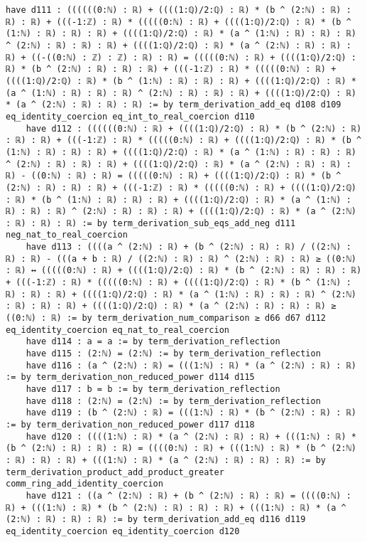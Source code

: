 \documentclass{article}
\begin{document}
\begin{tcolorbox}[colback=white!10, width=\linewidth]
\begin{lstlisting}[language=Lean4]
    have d111 : ((((((0:ℕ) : ℝ) + ((((1:ℚ)/2:ℚ) : ℝ) * (b ^ (2:ℕ) : ℝ) : ℝ) : ℝ) + (((-1:ℤ) : ℝ) * (((((0:ℕ) : ℝ) + ((((1:ℚ)/2:ℚ) : ℝ) * (b ^ (1:ℕ) : ℝ) : ℝ) : ℝ) + ((((1:ℚ)/2:ℚ) : ℝ) * (a ^ (1:ℕ) : ℝ) : ℝ) : ℝ) ^ (2:ℕ) : ℝ) : ℝ) : ℝ) + ((((1:ℚ)/2:ℚ) : ℝ) * (a ^ (2:ℕ) : ℝ) : ℝ) : ℝ) + ((-((0:ℕ) : ℤ) : ℤ) : ℝ) : ℝ) = (((((0:ℕ) : ℝ) + ((((1:ℚ)/2:ℚ) : ℝ) * (b ^ (2:ℕ) : ℝ) : ℝ) : ℝ) + (((-1:ℤ) : ℝ) * (((((0:ℕ) : ℝ) + ((((1:ℚ)/2:ℚ) : ℝ) * (b ^ (1:ℕ) : ℝ) : ℝ) : ℝ) + ((((1:ℚ)/2:ℚ) : ℝ) * (a ^ (1:ℕ) : ℝ) : ℝ) : ℝ) ^ (2:ℕ) : ℝ) : ℝ) : ℝ) + ((((1:ℚ)/2:ℚ) : ℝ) * (a ^ (2:ℕ) : ℝ) : ℝ) : ℝ) := by term_derivation_add_eq d108 d109 eq_identity_coercion eq_int_to_real_coercion d110
    have d112 : ((((((0:ℕ) : ℝ) + ((((1:ℚ)/2:ℚ) : ℝ) * (b ^ (2:ℕ) : ℝ) : ℝ) : ℝ) + (((-1:ℤ) : ℝ) * (((((0:ℕ) : ℝ) + ((((1:ℚ)/2:ℚ) : ℝ) * (b ^ (1:ℕ) : ℝ) : ℝ) : ℝ) + ((((1:ℚ)/2:ℚ) : ℝ) * (a ^ (1:ℕ) : ℝ) : ℝ) : ℝ) ^ (2:ℕ) : ℝ) : ℝ) : ℝ) + ((((1:ℚ)/2:ℚ) : ℝ) * (a ^ (2:ℕ) : ℝ) : ℝ) : ℝ) - ((0:ℕ) : ℝ) : ℝ) = (((((0:ℕ) : ℝ) + ((((1:ℚ)/2:ℚ) : ℝ) * (b ^ (2:ℕ) : ℝ) : ℝ) : ℝ) + (((-1:ℤ) : ℝ) * (((((0:ℕ) : ℝ) + ((((1:ℚ)/2:ℚ) : ℝ) * (b ^ (1:ℕ) : ℝ) : ℝ) : ℝ) + ((((1:ℚ)/2:ℚ) : ℝ) * (a ^ (1:ℕ) : ℝ) : ℝ) : ℝ) ^ (2:ℕ) : ℝ) : ℝ) : ℝ) + ((((1:ℚ)/2:ℚ) : ℝ) * (a ^ (2:ℕ) : ℝ) : ℝ) : ℝ) := by term_derivation_sub_eqs_add_neg d111 neg_nat_to_real_coercion
    have d113 : ((((a ^ (2:ℕ) : ℝ) + (b ^ (2:ℕ) : ℝ) : ℝ) / ((2:ℕ) : ℝ) : ℝ) - (((a + b : ℝ) / ((2:ℕ) : ℝ) : ℝ) ^ (2:ℕ) : ℝ) : ℝ) ≥ ((0:ℕ) : ℝ) ↔ (((((0:ℕ) : ℝ) + ((((1:ℚ)/2:ℚ) : ℝ) * (b ^ (2:ℕ) : ℝ) : ℝ) : ℝ) + (((-1:ℤ) : ℝ) * (((((0:ℕ) : ℝ) + ((((1:ℚ)/2:ℚ) : ℝ) * (b ^ (1:ℕ) : ℝ) : ℝ) : ℝ) + ((((1:ℚ)/2:ℚ) : ℝ) * (a ^ (1:ℕ) : ℝ) : ℝ) : ℝ) ^ (2:ℕ) : ℝ) : ℝ) : ℝ) + ((((1:ℚ)/2:ℚ) : ℝ) * (a ^ (2:ℕ) : ℝ) : ℝ) : ℝ) ≥ ((0:ℕ) : ℝ) := by term_derivation_num_comparison ≥ d66 d67 d112 eq_identity_coercion eq_nat_to_real_coercion
    have d114 : a = a := by term_derivation_reflection
    have d115 : (2:ℕ) = (2:ℕ) := by term_derivation_reflection
    have d116 : (a ^ (2:ℕ) : ℝ) = (((1:ℕ) : ℝ) * (a ^ (2:ℕ) : ℝ) : ℝ) := by term_derivation_non_reduced_power d114 d115
    have d117 : b = b := by term_derivation_reflection
    have d118 : (2:ℕ) = (2:ℕ) := by term_derivation_reflection
    have d119 : (b ^ (2:ℕ) : ℝ) = (((1:ℕ) : ℝ) * (b ^ (2:ℕ) : ℝ) : ℝ) := by term_derivation_non_reduced_power d117 d118
    have d120 : ((((1:ℕ) : ℝ) * (a ^ (2:ℕ) : ℝ) : ℝ) + (((1:ℕ) : ℝ) * (b ^ (2:ℕ) : ℝ) : ℝ) : ℝ) = ((((0:ℕ) : ℝ) + (((1:ℕ) : ℝ) * (b ^ (2:ℕ) : ℝ) : ℝ) : ℝ) + (((1:ℕ) : ℝ) * (a ^ (2:ℕ) : ℝ) : ℝ) : ℝ) := by term_derivation_product_add_product_greater comm_ring_add_identity_coercion
    have d121 : ((a ^ (2:ℕ) : ℝ) + (b ^ (2:ℕ) : ℝ) : ℝ) = ((((0:ℕ) : ℝ) + (((1:ℕ) : ℝ) * (b ^ (2:ℕ) : ℝ) : ℝ) : ℝ) + (((1:ℕ) : ℝ) * (a ^ (2:ℕ) : ℝ) : ℝ) : ℝ) := by term_derivation_add_eq d116 d119 eq_identity_coercion eq_identity_coercion d120

\end{lstlisting}
\end{tcolorbox}
\end{document}
